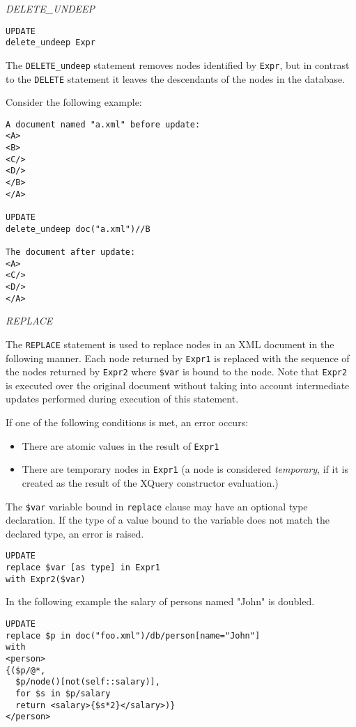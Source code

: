 \documentclass[a4paper,12pt]{article}
\begin{document}
\emph{DELETE\_UNDEEP}
\begin{verbatim}
UPDATE
delete_undeep Expr
\end{verbatim}

The \verb!DELETE_undeep! statement removes nodes identified by \verb!Expr!, but in contrast to the \verb!DELETE! statement it leaves the descendants of the nodes in the database.

Consider the following example:
\begin{verbatim}
A document named "a.xml" before update:
<A>
<B>
<C/>
<D/>
</B>
</A>

UPDATE
delete_undeep doc("a.xml")//B

The document after update:
<A>
<C/>
<D/>
</A>
\end{verbatim}

\emph{REPLACE}

The \verb!REPLACE! statement is used to replace nodes in an XML document in the following manner. Each node returned by \verb!Expr1! is replaced with the sequence of the nodes returned by \verb!Expr2! where \verb!$var! is bound to the node. Note that \verb!Expr2! is executed over the original document without taking into account intermediate updates performed during execution of this statement.

If one of the following conditions is met, an error occurs:
\begin{itemize}
\item There are atomic values in the result of \verb!Expr1!
\item There are temporary nodes in  \verb!Expr1! (a node is considered \emph{temporary}, if it is created as the result of the XQuery constructor evaluation.)
\end{itemize}

The \verb!$var! variable bound in \verb!replace! clause may have an optional type declaration. If the type of a value bound to the variable does not match the declared type, an error is raised.

\begin{verbatim}
UPDATE
replace $var [as type] in Expr1
with Expr2($var)
\end{verbatim}

In the following example the salary of persons named "John" is doubled.

\begin{verbatim}
UPDATE
replace $p in doc("foo.xml")/db/person[name="John"]
with
<person>
{($p/@*,
  $p/node()[not(self::salary)],
  for $s in $p/salary
  return <salary>{$s*2}</salary>)}
</person>
\end{verbatim}
\end{document}
